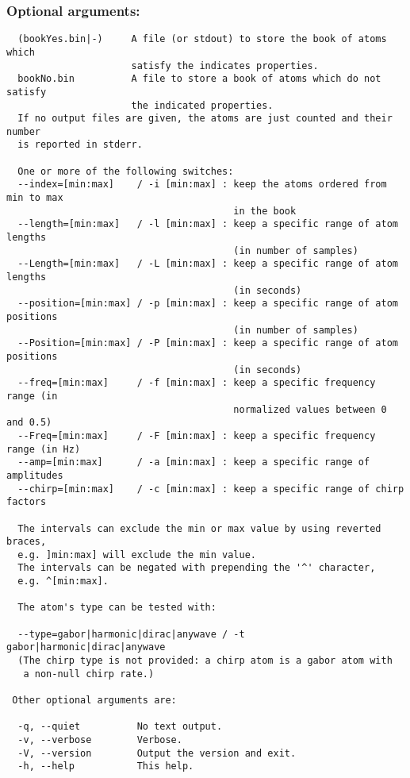 \documentclass[11pt,a4paper]{article}
\begin{document}
\subsubsection*{Optional arguments:}
\begin{verbatim}
  (bookYes.bin|-)     A file (or stdout) to store the book of atoms which
                      satisfy the indicates properties.
  bookNo.bin          A file to store a book of atoms which do not satisfy
                      the indicated properties.
  If no output files are given, the atoms are just counted and their number
  is reported in stderr.

  One or more of the following switches:
  --index=[min:max]    / -i [min:max] : keep the atoms ordered from min to max
                                        in the book
  --length=[min:max]   / -l [min:max] : keep a specific range of atom lengths
                                        (in number of samples)
  --Length=[min:max]   / -L [min:max] : keep a specific range of atom lengths
                                        (in seconds)
  --position=[min:max] / -p [min:max] : keep a specific range of atom positions
                                        (in number of samples)
  --Position=[min:max] / -P [min:max] : keep a specific range of atom positions
                                        (in seconds)
  --freq=[min:max]     / -f [min:max] : keep a specific frequency range (in
                                        normalized values between 0 and 0.5)
  --Freq=[min:max]     / -F [min:max] : keep a specific frequency range (in Hz)
  --amp=[min:max]      / -a [min:max] : keep a specific range of amplitudes
  --chirp=[min:max]    / -c [min:max] : keep a specific range of chirp factors

  The intervals can exclude the min or max value by using reverted braces,
  e.g. ]min:max] will exclude the min value.
  The intervals can be negated with prepending the '^' character,
  e.g. ^[min:max].

  The atom's type can be tested with:

  --type=gabor|harmonic|dirac|anywave / -t gabor|harmonic|dirac|anywave
  (The chirp type is not provided: a chirp atom is a gabor atom with
   a non-null chirp rate.)

 Other optional arguments are:

  -q, --quiet          No text output.
  -v, --verbose        Verbose.
  -V, --version        Output the version and exit.
  -h, --help           This help.
\end{verbatim}
\end{document}
